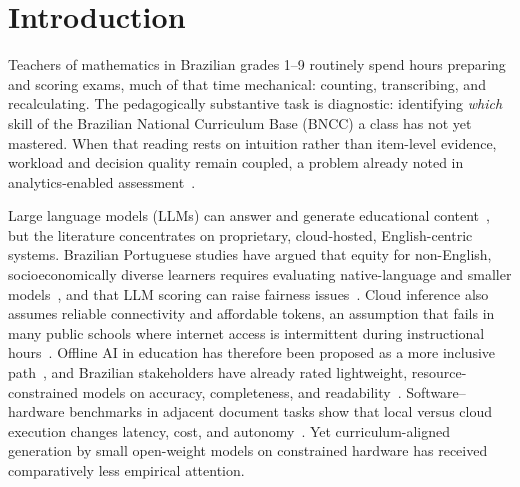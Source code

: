 \documentclass[fleqn,10pt]{JLA_article}
\begin{document}
\flushbottom
\maketitle
\thispagestyle{fancy}
\section{Introduction}
Teachers of mathematics in Brazilian grades 1--9 routinely spend hours preparing and scoring exams, much of that time mechanical: counting, transcribing, and recalculating. The pedagogically substantive task is diagnostic: identifying \emph{which} skill of the Brazilian National Curriculum Base (BNCC) a class has not yet mastered. When that reading rests on intuition rather than item-level evidence, workload and decision quality remain coupled, a problem already noted in analytics-enabled assessment~\autocite{gasevic2022towards,portela2024equity}.

Large language models (LLMs) can answer and generate educational content~\autocite{minaee2024llms,mello2024wordsofwisdom}, but the literature concentrates on proprietary, cloud-hosted, English-centric systems. Brazilian Portuguese studies have argued that equity for non-English, socioeconomically diverse learners requires evaluating native-language and smaller models~\autocite{pires2023sabia,rodrigues2025llms}, and that LLM scoring can raise fairness issues~\autocite{rodrigues2025gpt4fair,lobo2025scoring}. Cloud inference also assumes reliable connectivity and affordable tokens, an assumption that fails in many public schools where internet access is intermittent during instructional hours~\autocite{portela2024unplugged,mello2023offline,freitas2022learning}. Offline AI in education has therefore been proposed as a more inclusive path~\autocite{mello2023offline,portela2023aied,portela2024unplugged}, and Brazilian stakeholders have already rated lightweight, resource-constrained models on accuracy, completeness, and readability~\autocite{barros2025resourceconstrained}. Software--hardware benchmarks in adjacent document tasks show that local versus cloud execution changes latency, cost, and autonomy~\autocite{sarmanho2026ocr}. Yet curriculum-aligned generation by small open-weight models on constrained hardware has received comparatively less empirical attention.
\end{document}

